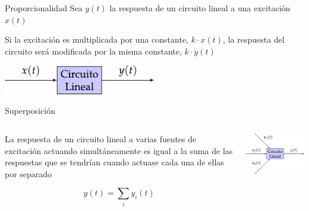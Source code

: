 \documentclass[aspectratio=169, xcolor={usenames,svgnames,dvipsnames}]{beamer}
\begin{document}

\begin{frame}{Proporcionalidad}
    Sea \(y(t)\) la respuesta de un \alert{circuito lineal} a una excitación \(x(t)\) 
    \vspace{5mm}
    
    Si la excitación es multiplicada por una \alert{constante}, \(k \cdot x(t)\), la respuesta del circuito será modificada por la misma constante, \(k \cdot y(t)\)
    \vspace{10mm}
    
    \begin{center}
        \includegraphics[width=0.5\textwidth]{../figs/proporcionalidad.pdf}
    \end{center}
\end{frame}


\begin{frame}{Superposición}
    \begin{columns}
    \begin{column}{0.57\columnwidth}
    La respuesta de un \alert{circuito lineal} a varias fuentes de excitación actuando simultáneamente es igual a la \alert{suma de las respuestas} que se tendrían cuando actuase cada una de ellas por separado
    
    \[
    y(t) = \sum_i y_i(t)
    \]
    \end{column}
    
    \begin{column}{0.42\columnwidth}
        \begin{center}
            \includegraphics[width=1\linewidth]{../figs/superposicion.pdf}
        \end{center}
    \end{column}
    \end{columns}
\end{frame}
\end{document}
